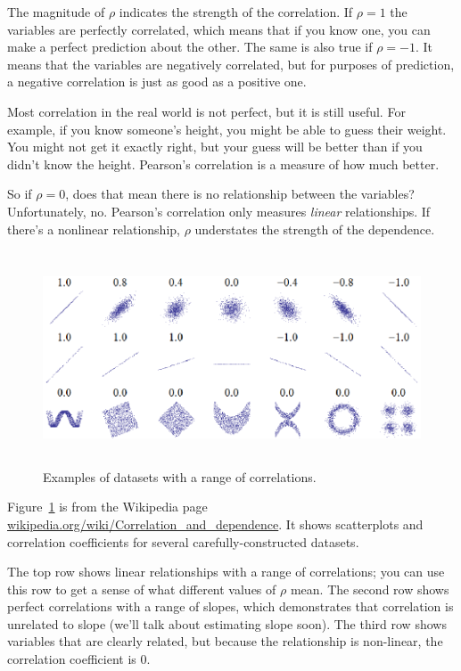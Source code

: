 \documentclass[12pt]{book}
\begin{document}
The magnitude of $\rho$ indicates the strength of the correlation.  If
$\rho=1$ the variables are perfectly correlated, which means that if
you know one, you can make a perfect prediction about the other.  The
same is also true if $\rho=-1$.  It means that the variables
are negatively correlated, but for purposes of prediction, a
negative correlation is just as good as a positive one.

Most correlation in the real world is not perfect, but it
is still useful.  For example, if you know someone's height, you might
be able to guess their weight.  You might not get it exactly right, but
your guess will be better than if you didn't know the height.
Pearson's correlation is a measure of how much better.

So if $\rho=0$, does that mean there is no
relationship between the variables?  Unfortunately, no.  Pearson's
correlation only measures {\em linear} relationships.  If there's a
nonlinear relationship, $\rho$ understates the strength of the
dependence.

\begin{figure}
\centerline{\includegraphics[height=2.5in]{figs/Correlation_examples.eps}}
\caption{Examples of datasets with a range of correlations.}
\label{corr_examples}
\end{figure}

Figure~\ref{corr_examples} is from the Wikipedia page
\url{wikipedia.org/wiki/Correlation_and_dependence}.  It shows
scatterplots and correlation coefficients for several
carefully-constructed datasets.



The top row shows linear relationships with a range of correlations;
you can use this row to get a sense of what different values of $\rho$
mean.  The second row shows perfect correlations with a range of
slopes, which demonstrates that correlation is unrelated to slope
(we'll talk about estimating slope soon).  The third
row shows variables that are clearly related, but because the
relationship is non-linear, the correlation coefficient is 0.
\end{document}
